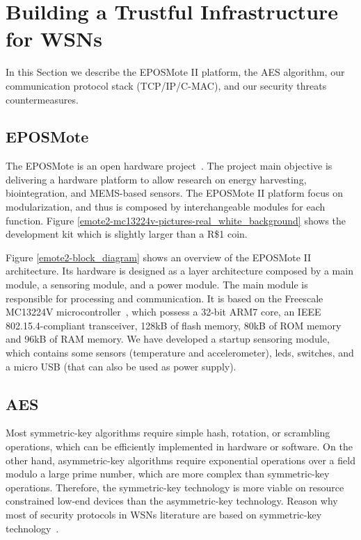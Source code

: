 \section{Building a Trustful Infrastructure for WSNs}
\label{sec:solution}
In this Section we describe the EPOSMote II platform, the AES algorithm, our communication protocol stack (TCP/IP/C-MAC), and our security threats countermeasures.

\subsection{EPOSMote}
The EPOSMote is an open hardware project~\cite{eposmote}. 
The project main objective is delivering a hardware platform to allow research on energy harvesting, biointegration, and MEMS-based sensors.
The EPOSMote II platform focus on modularization, and thus is composed by interchangeable modules for each function.
Figure \ref{emote2-mc13224v-pictures-real_white_background} shows the development kit which is slightly larger than a R\$1 coin. 


Figure \ref{emote2-block_diagram} shows an overview of the EPOSMote II architecture.
Its hardware is designed as a layer architecture composed by a main module,
a sensoring module, and a power module. The main module is responsible for processing
and communication. It is based on the Freescale MC13224V microcontroller~\cite{mc13224v}, which possess 
a 32-bit ARM7 core, an IEEE 802.15.4-compliant transceiver, 128kB of flash memory, 80kB of ROM memory
and 96kB of RAM memory. We have developed a startup sensoring module, which contains some sensors  
(temperature and accelerometer), leds, switches, and a micro USB (that can also be used as power supply). 


\subsection{AES}
Most symmetric-key algorithms require simple hash, rotation, or scrambling operations, which can be efficiently implemented in hardware or software.
On the other hand, asymmetric-key algorithms require exponential operations over a field modulo a large prime number, which are more complex than symmetric-key operations.
Therefore, the symmetric-key technology is more viable on resource constrained low-end devices than the asymmetric-key technology.
Reason why most of security protocols in WSNs literature are based on symmetric-key technology~\cite{Zhou:2008}.

